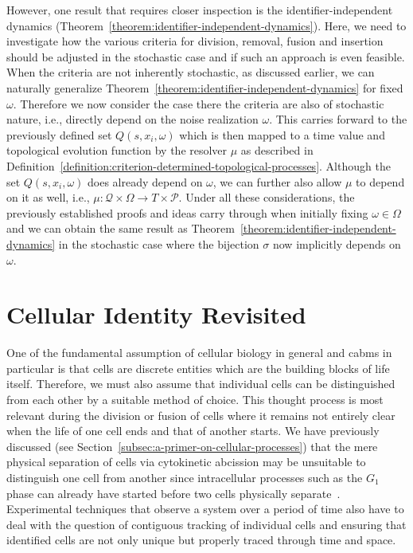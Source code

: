 However, one result that requires closer inspection is the identifier-independent dynamics
(Theorem~\ref{theorem:identifier-independent-dynamics}).
Here, we need to investigate how the various criteria for division, removal, fusion and insertion
should be adjusted in the stochastic case and if such an approach is even feasible.
When the criteria are not inherently stochastic, as discussed earlier, we can naturally generalize
Theorem~\ref{theorem:identifier-independent-dynamics} for fixed $\omega$.
Therefore we now consider the case there the criteria are also of stochastic nature, i.e., directly
depend on the noise realization $\omega$.
This carries forward to the previously defined set $Q(s,x_i,\omega)$ which is then mapped to a time
value and topological evolution function by the resolver $\mu$ as described in
Definition~\ref{definition:criterion-determined-topological-processes}.
Although the set $Q(s,x_i,\omega)$ does already depend on $\omega$, we can further also allow $\mu$
to depend on it as well, i.e., $\mu:\mathcal{Q}\times\Omega\rightarrow T\times\mathcal{P}$.
Under all these considerations, the previously established proofs and ideas carry through when
initially fixing $\omega\in\Omega$ and we can obtain the same result as
Theorem~\ref{theorem:identifier-independent-dynamics} in the stochastic case where the bijection
$\sigma$ now implicitly depends on $\omega$.


\section{Cellular Identity Revisited}
\label{sec:cellular-identity-revisited}
One of the fundamental assumption of cellular biology in general and \acp{cabm} in particular is
that cells are discrete entities which are the building blocks of life itself.
Therefore, we must also assume that individual cells can be distinguished from each other by a
suitable method of choice.
This thought process is most relevant during the division or fusion of cells where it remains not
entirely clear when the life of one cell ends and that of another starts.
We have previously discussed (see Section~\ref{subsec:a-primer-on-cellular-processes}) that the mere
physical separation of cells via cytokinetic abcission may be unsuitable to distinguish one cell
from another since intracellular processes such as the $G_1$ phase can already have started before
two cells physically separate~\cite{Gershony2014}.
Experimental techniques that observe a system over a period of time also have to deal with the
question of contiguous tracking of individual cells and ensuring that identified cells are not only
unique but properly traced through time and space.

